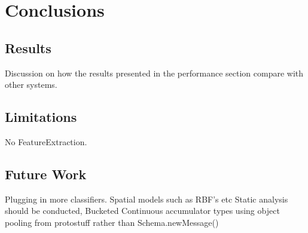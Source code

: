 \documentclass[a4paper,11pt]{scrreprt}
\begin{document}
\chapter{Conclusions}
\section{Results}
Discussion on how the results presented in the performance section compare with other systems.
\section{Limitations}
No FeatureExtraction.
\section{Future Work}
Plugging in more classifiers. Spatial models such as RBF's etc
Static analysis should be conducted,
Bucketed Continuous accumulator types
using object pooling from protostuff rather than Schema.newMessage()

\printbibliography
\end{document}
